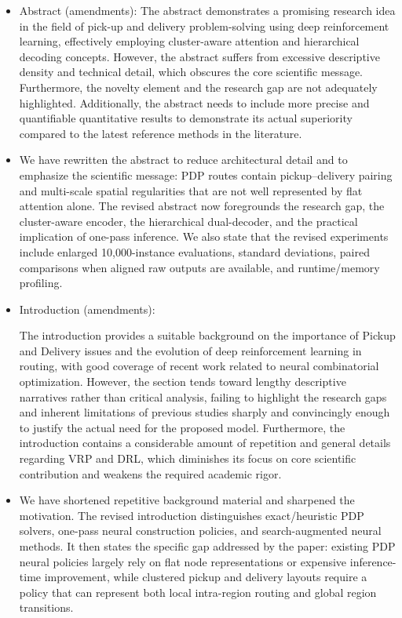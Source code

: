 \documentclass{article}
\begin{document}
\begin{itemize}
\item[\textbf{Comment. 1}] {Abstract (amendments):
The abstract demonstrates a promising research idea in the field of pick-up and delivery problem-solving using deep reinforcement learning, effectively employing cluster-aware attention and hierarchical decoding concepts. However, the abstract suffers from excessive descriptive density and technical detail, which obscures the core scientific message. Furthermore, the novelty element and the research gap are not adequately highlighted. Additionally, the abstract needs to include more precise and quantifiable quantitative results to demonstrate its actual superiority compared to the latest reference methods in the literature.}


\item[\textbf{Response:}] We have rewritten the abstract to reduce architectural detail and to emphasize the scientific message: PDP routes contain pickup--delivery pairing and multi-scale spatial regularities that are not well represented by flat attention alone. The revised abstract now foregrounds the research gap, the cluster-aware encoder, the hierarchical dual-decoder, and the practical implication of one-pass inference. We also state that the revised experiments include enlarged 10,000-instance evaluations, standard deviations, paired comparisons when aligned raw outputs are available, and runtime/memory profiling.


\item[\textbf{Comment. 2}] {Introduction (amendments):


The introduction provides a suitable background on the importance of Pickup and Delivery issues and the evolution of deep reinforcement learning in routing, with good coverage of recent work related to neural combinatorial optimization. However, the section tends toward lengthy descriptive narratives rather than critical analysis, failing to highlight the research gaps and inherent limitations of previous studies sharply and convincingly enough to justify the actual need for the proposed model. Furthermore, the introduction contains a considerable amount of repetition and general details regarding VRP and DRL, which diminishes its focus on core scientific contribution and weakens the required academic rigor.}


\item[\textbf{Response:}] We have shortened repetitive background material and sharpened the motivation. The revised introduction distinguishes exact/heuristic PDP solvers, one-pass neural construction policies, and search-augmented neural methods. It then states the specific gap addressed by the paper: existing PDP neural policies largely rely on flat node representations or expensive inference-time improvement, while clustered pickup and delivery layouts require a policy that can represent both local intra-region routing and global region transitions.



\end{itemize}
\end{document}
